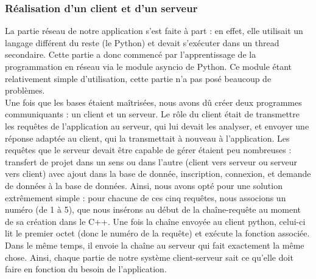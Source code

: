 \documentclass{report}
\begin{document}
\subsubsection{Réalisation d'un client et d'un serveur}
La partie réseau de notre application s'est faite à part : en effet, elle utilisait un langage différent du reste (le Python) et devait s'exécuter dans un thread secondaire. Cette partie a donc commencé par l'apprentissage de la programmation en réseau via le module asyncio de Python. Ce module étant relativement simple d'utilisation, cette partie n'a pas posé beaucoup de problèmes. \\
Une fois que les bases étaient maîtrisées, nous avons dû créer deux programmes communiquants : un client et un serveur. Le rôle du client était de transmettre les requêtes de l'application au serveur, qui lui devait les analyser, et envoyer une réponse adaptée au client, qui la transmettait à nouveau à l'application. Les requêtes que le serveur devait être capable de gérer étaient peu nombreuses : transfert de projet dans un sens ou dans l'autre (client vers serveur ou serveur vers client) avec ajout dans la base de donnée, inscription, connexion, et demande de données à la base de données. Ainsi, nous avons opté pour une solution extrêmement simple : pour chacune de ces cinq requêtes, nous associons un numéro (de 1 à 5), que nous insérons au début de la chaîne-requête au moment de sa création dans le C++. Une fois la chaîne envoyée au client python, celui-ci lit le premier octet (donc le numéro de la requête) et exécute la fonction associée. Dans le même temps, il envoie la chaîne au serveur qui fait exactement la même chose. Ainsi, chaque partie de notre système client-serveur sait ce qu'elle doit faire en fonction du besoin de l'application.
\end{document}
